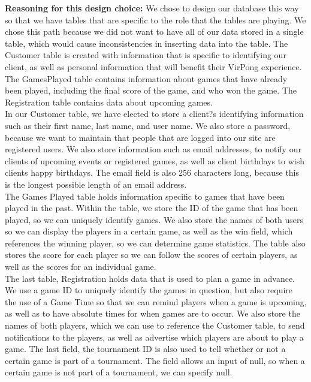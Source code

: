 			\textbf{Reasoning for this design choice:}
				We chose to design our database this way so that we have tables that are specific to the role that the tables are playing. We chose this path because we did not want to have all of our data stored in a single table, which would cause inconsistencies in inserting data into the table. The Customer table is created with information that is specific to identifying our client, as well as personal information that will benefit their VirPong experience. The GamesPlayed table contains information about games that have already been played, including the final score of the game, and who won the game. The Registration table contains data about upcoming games.\\
				In our Customer table, we have elected to store a client?s identifying information such as their first name, last name, and user name. We also store a password, because we want to maintain that people that are logged into our site are registered users. We also store information such as email addresses, to notify our clients of upcoming events or registered games, as well as client birthdays to wish clients happy birthdays. The email field is also 256 characters long, because this is the longest possible length of an email address.\\
				The Games Played table holds information specific to games that have been played in the past. Within the table, we store the ID of the game that has been played, so we can uniquely identify games. We also store the names of both users so we can display the players in a certain game, as well as the win field, which references the winning player, so we can determine game statistics. The table also stores the score for each player so we can follow the scores of certain players, as well as the scores for an individual game.\\
				The last table, Registration holds data that is used to plan a game in advance. We use a game ID to uniquely identify the games in question, but also require the use of a Game Time so that we can remind players when a game is upcoming, as well as to have absolute times for when games are to occur. We also store the names of both players, which we can use to reference the Customer table, to send notifications to the players, as well as advertise which players are about to play a game. The last field, the tournament ID is also used to tell whether or not a certain game is part of a tournament. The field allows an input of null, so when a certain game is not part of a tournament, we can specify null.
